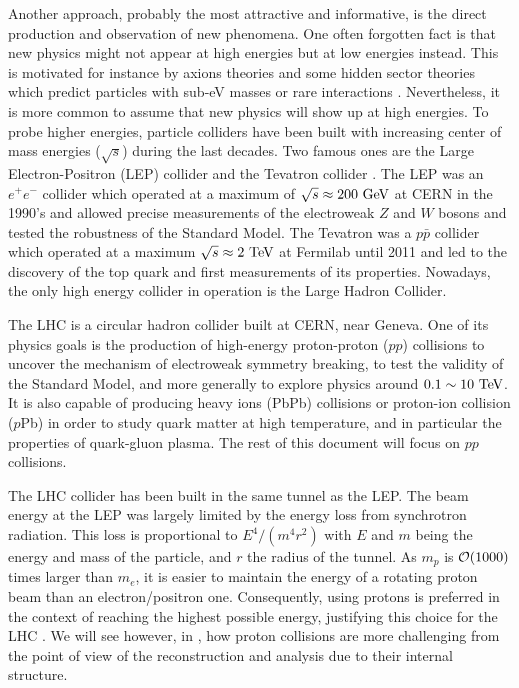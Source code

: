    Another approach, probably the most attractive and informative, is the direct production and observation of
    new phenomena. One often forgotten fact is that new physics might not appear at high
    energies but at low energies instead. This is motivated for instance by axions
    theories and some hidden sector theories which predict particles with sub-eV masses
    or rare interactions \cite{PolarizedHelium, CavityForHiddenPhotons}. Nevertheless, it
    is more common to assume that new physics will show up at high energies. To probe
    higher energies, particle colliders have been
    built with increasing center of mass energies ($\sqrt{s}$) during the last decades.
    Two famous ones are the Large Electron-Positron (LEP) collider \cite{LEP} and the
    Tevatron collider \cite{Tevatron}. The
    LEP was an $e^+e^-$ collider which operated at a maximum of $\sqrt{s} \approx 200~\text{GeV}$
    at CERN in the 1990's and allowed precise measurements of the electroweak $Z$ and $W$
    bosons and tested the robustness of the Standard Model. The Tevatron was a $p\bar{p}$
    collider which operated at a maximum $\sqrt{s} \approx 2~\text{TeV}$ at Fermilab until 2011
    and led to the discovery of the top quark and first measurements of its properties.
    Nowadays, the only high energy collider in operation is the Large Hadron Collider.

    The LHC \cite{LHC} is a circular hadron collider built at CERN, near Geneva. One of its physics
    goals is the production of high-energy proton-proton ($pp$) collisions to uncover the mechanism
    of electroweak symmetry breaking, to test the validity of the Standard Model, and more
    generally to explore physics around $0.1 \sim 10~\text{TeV}$.
    It is also capable of producing heavy ions (PbPb) collisions or proton-ion
    collision ($p$Pb) in order to study quark matter at high temperature,
    and in particular the properties of quark-gluon plasma. The rest of this document will
    focus on $pp$ collisions.

    The LHC collider has been built in the same tunnel as the LEP. The beam energy at
    the LEP was largely limited by the energy loss from synchrotron radiation. This loss
    is proportional to $E^4 / (m^{4} r^{2})$ with $E$ and $m$ being the energy and mass of the
    particle, and $r$ the radius of the tunnel. As $m_p$ is $\mathcal{O}(1000)$ times larger than $m_e$, it is
    easier to maintain the energy of a rotating proton beam than an electron/positron one.
    Consequently, using protons is preferred in the context of reaching the highest possible
    energy, justifying this choice for the LHC . We will see however, in
    , how proton collisions are more challenging
    from the point of view of the reconstruction and analysis due to their internal structure.


